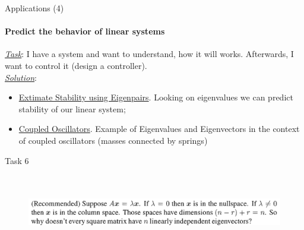 \documentclass[aspectratio=169]{beamer}
\begin{document}
\begin{frame}[t]{Applications (4)}
    \framesubtitle{Predict the behavior of linear systems}
    \Large
    \underline{\textit{Task}}: I have a system and want to understand, how it will works. Afterwards, I want to control it (design a controller). \\
    \underline{\textit{Solution}}:
    \begin{itemize}
        \item \href{https://youtu.be/h7nJ6ZL4Lf0}{Extimate Stability using Eigenpairs}. Looking on eigenvalues we can predict stability of our linear system;
        \item \href{https://youtu.be/x_ZkKPtgTeA}{Coupled Oscillators}. Example of Eigenvalues and Eigenvectors in the context of coupled oscillators (masses connected by springs)
    \end{itemize}
\end{frame}

\begin{frame}[t]{Task 6}
    \framesubtitle{}
    \vspace{-0.5cm}
    \begin{figure}[H]
        \centering\includegraphics[height=3cm,width=1\textwidth,keepaspectratio]{6.png}
        \label{fig:6.png}
    \end{figure}
\end{frame}
\end{document}
